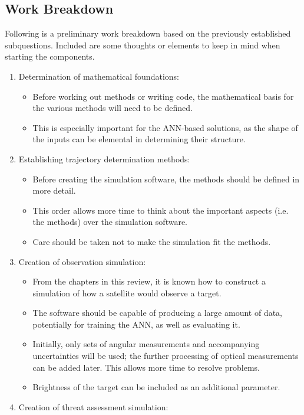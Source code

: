 \subsection{Work Breakdown}
Following is a preliminary work breakdown based on the previously established subquestions. Included are some thoughts or elements to keep in mind when starting the components.
\begin{enumerate}
    \item Determination of mathematical foundations:
    \begin{itemize}
        \item Before working out methods or writing code, the mathematical basis for the various methods will need to be defined.
        \item This is especially important for the ANN-based solutions, as the shape of the inputs can be elemental in determining their structure.
    \end{itemize}
    \item Establishing trajectory determination methods:
    \begin{itemize}
        \item Before creating the simulation software, the methods should be defined in more detail.
        \item This order allows more time to think about the important aspects (i.e. the methods) over the simulation software.
        \item Care should be taken not to make the simulation fit the methods.
    \end{itemize}
    \item Creation of observation simulation:
    \begin{itemize}
        \item From the chapters in this review, it is known how to construct a simulation of how a satellite would observe a target.
        \item The software should be capable of producing a large amount of data, potentially for training the ANN, as well as evaluating it.
        \item Initially, only sets of angular measurements and accompanying uncertainties will be used; the further processing of optical measurements can be added later. This allows more time to resolve problems.
        \item Brightness of the target can be included as an additional parameter.
    \end{itemize}
    \item Creation of threat assessment simulation:

\end{enumerate}
